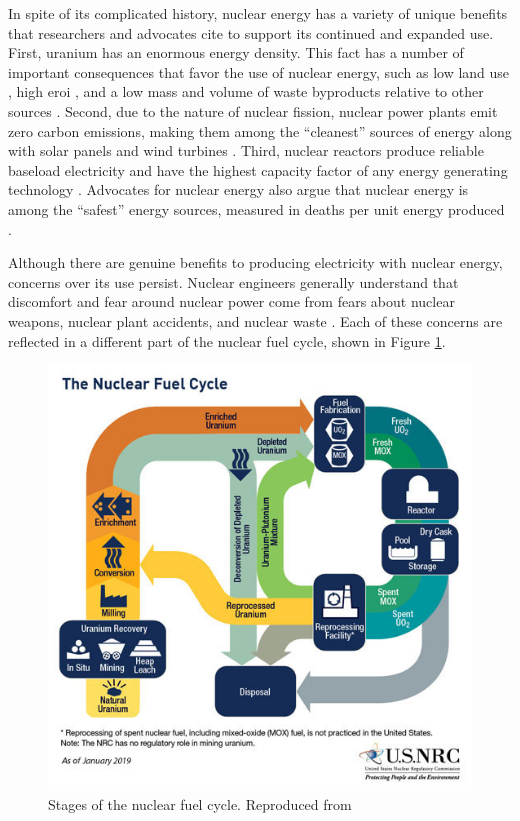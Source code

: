 In spite of its complicated history, nuclear energy has a variety of unique
benefits that researchers and advocates cite to support its continued and
expanded use. First, uranium has an enormous energy density. This fact has a
number of important consequences that favor the use of nuclear energy, such as
low land use \cite{lovering_land-use_2022,van_zalk_spatial_2018}, high \ac{eroi}
\cite{weisbach_energy_2013,murphy_energy_2022}, and a low mass and volume of
waste byproducts relative to other sources
\cite{liu_wind_2017,chowdhury_overview_2020,holdsworth_spent_2023,taebi_recycle_2008}.
Second, due to the nature of nuclear fission, nuclear power plants emit zero
carbon emissions, making them among the ``cleanest'' sources of energy along
with solar panels and wind turbines
\cite{nicholson_life_2021,intergovernmental_panel_on_climate_change_climate_2021,
brook_why_2014,van_de_graaff_understanding_2016}. Third, nuclear reactors
produce reliable baseload electricity and have the highest capacity factor of
any energy generating technology
\cite{brook_why_2014,van_de_graaff_understanding_2016}. Advocates for nuclear
energy also argue that nuclear energy is among the ``safest'' energy sources,
measured in deaths per unit energy produced
\cite{brook_why_2014,van_de_graaff_understanding_2016,sovacool_balancing_2016}.


Although there are genuine benefits to producing electricity with nuclear
energy, concerns over its use persist. Nuclear engineers generally understand
that discomfort and fear around nuclear power come from fears about nuclear
weapons, nuclear plant accidents, and nuclear waste \cite{roeser_nuclear_2011}.
Each of these concerns are reflected in a different part of the nuclear fuel cycle,
shown in Figure \ref{fig:nuclear-fuel-cycle}.

\begin{figure}[ht]
    \centering
    \includegraphics[width=0.5\columnwidth]{figures/nuclear-fuel-cycle-02.jpeg}
    \caption{Stages of the nuclear fuel cycle. Reproduced from \cite{nuclear_regulatory_commission_stages_2020}}
    \label{fig:nuclear-fuel-cycle}
\end{figure}

